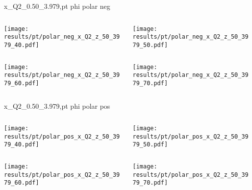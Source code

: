 \begin{frame}{x\_Q2\_0.50\_3.979,pt phi polar neg}
\begin{columns}
\begin{column}[T]{0.5\textwidth}
\texttt{[image: results/pt/polar\_neg\_x\_Q2\_z\_50\_3979\_40.pdf]}
\end{column}
\begin{column}[T]{0.5\textwidth}
\texttt{[image: results/pt/polar\_neg\_x\_Q2\_z\_50\_3979\_50.pdf]}
\end{column}
\end{columns}
\begin{columns}
\begin{column}[T]{0.5\textwidth}
\texttt{[image: results/pt/polar\_neg\_x\_Q2\_z\_50\_3979\_60.pdf]}
\end{column}
\begin{column}[T]{0.5\textwidth}
\texttt{[image: results/pt/polar\_neg\_x\_Q2\_z\_50\_3979\_70.pdf]}
\end{column}
\end{columns}
\end{frame}
\begin{frame}{x\_Q2\_0.50\_3.979,pt phi polar pos}
\begin{columns}
\begin{column}[T]{0.5\textwidth}
\texttt{[image: results/pt/polar\_pos\_x\_Q2\_z\_50\_3979\_40.pdf]}
\end{column}
\begin{column}[T]{0.5\textwidth}
\texttt{[image: results/pt/polar\_pos\_x\_Q2\_z\_50\_3979\_50.pdf]}
\end{column}
\end{columns}
\begin{columns}
\begin{column}[T]{0.5\textwidth}
\texttt{[image: results/pt/polar\_pos\_x\_Q2\_z\_50\_3979\_60.pdf]}
\end{column}
\begin{column}[T]{0.5\textwidth}
\texttt{[image: results/pt/polar\_pos\_x\_Q2\_z\_50\_3979\_70.pdf]}
\end{column}
\end{columns}
\end{frame}
